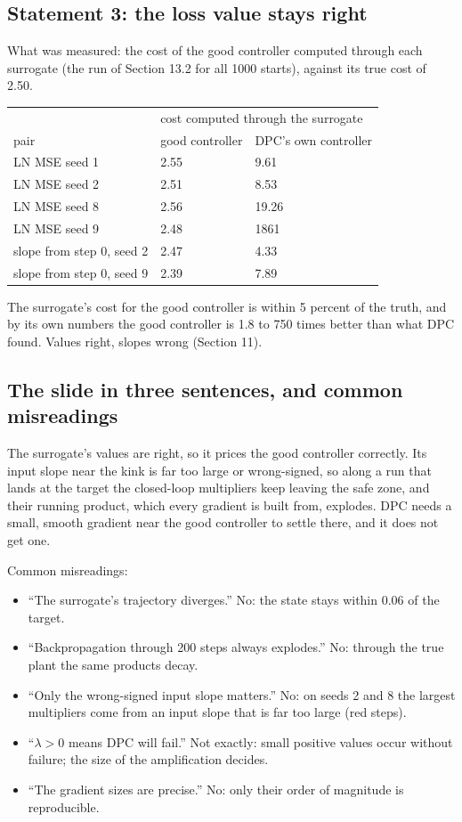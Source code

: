 \documentclass[11pt]{article}
\begin{document}
\subsection{Statement 3: the loss value stays right}

What was measured: the cost of the good controller computed through each surrogate (the run of Section 13.2 for all 1000 starts), against its true cost of 2.50.

\begin{center}
\begin{tabular}{lll}
\toprule
 & \multicolumn{2}{l}{cost computed through the surrogate} \\
pair & good controller & DPC's own controller \\
\midrule
LN MSE seed 1 & 2.55 & 9.61 \\
LN MSE seed 2 & 2.51 & 8.53 \\
LN MSE seed 8 & 2.56 & 19.26 \\
LN MSE seed 9 & 2.48 & 1861 \\
slope from step 0, seed 2 & 2.47 & 4.33 \\
slope from step 0, seed 9 & 2.39 & 7.89 \\
\bottomrule
\end{tabular}
\end{center}

The surrogate's cost for the good controller is within 5 percent of the truth, and by its own numbers the good controller is 1.8 to 750 times better than what DPC found. Values right, slopes wrong (Section 11).

\subsection{The slide in three sentences, and common misreadings}

The surrogate's values are right, so it prices the good controller correctly. Its input slope near the kink is far too large or wrong-signed, so along a run that lands at the target the closed-loop multipliers keep leaving the safe zone, and their running product, which every gradient is built from, explodes. DPC needs a small, smooth gradient near the good controller to settle there, and it does not get one.

Common misreadings:
\begin{itemize}
\item ``The surrogate's trajectory diverges.'' No: the state stays within 0.06 of the target.
\item ``Backpropagation through 200 steps always explodes.'' No: through the true plant the same products decay.
\item ``Only the wrong-signed input slope matters.'' No: on seeds 2 and 8 the largest multipliers come from an input slope that is far too large (red steps).
\item ``$\lambda>0$ means DPC will fail.'' Not exactly: small positive values occur without failure; the size of the amplification decides.
\item ``The gradient sizes are precise.'' No: only their order of magnitude is reproducible.
\end{itemize}
\end{document}
